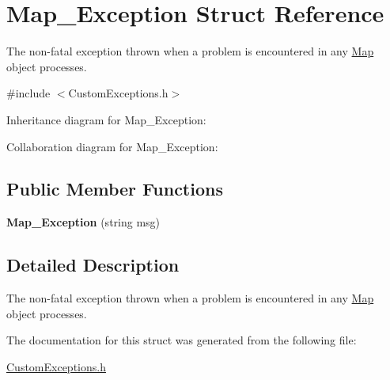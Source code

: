 \hypertarget{struct_map___exception}{}\section{Map\+\_\+\+Exception Struct Reference}
\label{struct_map___exception}


The non-\/fatal exception thrown when a problem is encountered in any \hyperlink{class_map}{Map} object processes.  




{\ttfamily \#include $<$Custom\+Exceptions.\+h$>$}



Inheritance diagram for Map\+\_\+\+Exception\+:


Collaboration diagram for Map\+\_\+\+Exception\+:
\subsection*{Public Member Functions}
\begin{DoxyCompactItemize}
\item 
{\bfseries Map\+\_\+\+Exception} (string msg)\hypertarget{struct_map___exception_afe744dc47a8e404d1c48fc8d6a69cf24}{}\label{struct_map___exception_afe744dc47a8e404d1c48fc8d6a69cf24}

\end{DoxyCompactItemize}


\subsection{Detailed Description}
The non-\/fatal exception thrown when a problem is encountered in any \hyperlink{class_map}{Map} object processes. 

The documentation for this struct was generated from the following file\+:\begin{DoxyCompactItemize}
\item 
\hyperlink{_custom_exceptions_8h}{Custom\+Exceptions.\+h}\end{DoxyCompactItemize}
